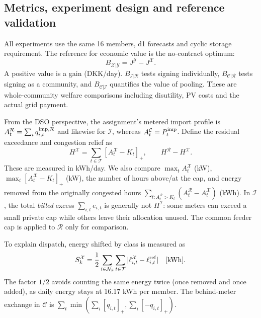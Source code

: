\documentclass[10pt,a4paper]{article}
\newcommand{\pos}[1]{\left[#1\right]_+}
\newcommand{\Rmod}{\mathcal R}
\newcommand{\Imod}{\mathcal I}
\newcommand{\Cmod}{\mathcal C}
\newcommand{\kWh}{\mathrm{kWh}}
\begin{document}
\subsection{Metrics, experiment design and reference validation}
\label{sec:metrics}
All experiments use the same 16 members, d1 forecasts and cyclic storage requirement. The reference for economic value is the no-contract optimum:
\begin{equation}
B_{\mathcal X|\mathcal Y}=J^{\mathcal Y}-J^{\mathcal X}.
\label{eq:gain}
\end{equation}
A positive value is a gain (DKK/day). $B_{\Imod|\Rmod}$ tests signing individually, $B_{\Cmod|\Rmod}$ tests signing as a community, and $B_{\Cmod|\Imod}$ quantifies the value of pooling. These are whole-community welfare comparisons including disutility, PV costs and the actual grid payment.

From the DSO perspective, the assignment's metered import profile is $A_t^{\Rmod}=\sum_i q_{i,t}^{\rm imp,\Rmod}$ and likewise for $\Imod$, whereas $A_t^{\Cmod}=P_t^{\rm imp}$. Define the residual exceedance and congestion relief as
\begin{equation}
H^\mathcal X=\sum_{t\in\mathcal T}\pos{A_t^\mathcal X-K_t},
\qquad H^\Rmod-H^\mathcal X .
\label{eq:relief}
\end{equation}
These are measured in kWh/day. We also compare $\max_t A_t^\mathcal X$ (kW), $\max_t\pos{A_t^\mathcal X-K_t}$ (kW), the number of hours above/at the cap, and energy removed from the originally congested hours $\sum_{t:A_t^\Rmod>K_t}(A_t^\Rmod-A_t^\mathcal X)$ (kWh). In $\Imod$, the total \emph{billed} excess $\sum_{i,t}e_{i,t}$ is generally not $H^\Imod$: some meters can exceed a small private cap while others leave their allocation unused. The common feeder cap is applied to $\Rmod$ only for comparison.

To explain dispatch, energy shifted by class is measured as
\begin{equation}
S_k^\mathcal X=\frac12\sum_{i\in\mathcal N_k}\sum_{t\in\mathcal T}
        |\ell_{i,t}^{\mathcal X}-\ell^{\rm ref}_{i,t}|\quad [\kWh].
\label{eq:shift}
\end{equation}
The factor $1/2$ avoids counting the same energy twice (once removed and once added), as daily energy stays at 16.17 kWh per member. The behind-meter exchange in $\Cmod$ is $\sum_t\min(\sum_i[q_{i,t}]_+,\sum_i[-q_{i,t}]_+)$.
\end{document}
